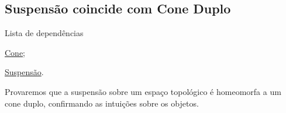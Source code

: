 \subsection{Suspensão coincide com Cone Duplo}
\label{suspensao-cone-duplo-prop}
\begin{titlemize}{Lista de dependências}
	\item \hyperref[cone-def]{Cone};\\
	\item \hyperref[suspensao-def]{Suspensão}.
\end{titlemize}
Provaremos que a suspensão sobre um espaço topológico é homeomorfa a um cone duplo, confirmando as intuições sobre os objetos.

